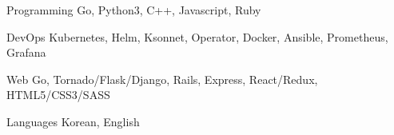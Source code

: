 

\begin{cvskills}

  \cvskill
    {Programming} %
    {Go, Python3, C++, Javascript, Ruby} %

  \cvskill
    {DevOps} %
    {Kubernetes, Helm, Ksonnet, Operator, Docker, Ansible, Prometheus, Grafana} %

  \cvskill
    {Web} %
    {Go, Tornado/Flask/Django, Rails, Express, React/Redux, HTML5/CSS3/SASS} %

  \cvskill
    {Languages} %
    {Korean, English} %

\end{cvskills}
